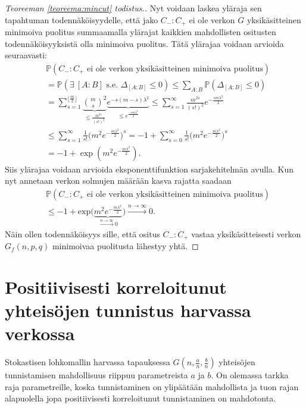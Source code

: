 \documentclass[finnish,12pt,a4paper,pdftex,sci,utf8]{aaltothesis}
\newcommand\floor[1]{\lfloor#1\rfloor}
\begin{document}
\begin{proof}[Teoreeman \ref{teoreema:mincut} todistus.]
Nyt voidaan laskea yläraja sen tapahtuman todennäköisyydelle, että jako $C_-:C_+$ ei ole verkon $G$ yksikäsitteinen minimoiva puolitus summaamalla ylärajat kaikkien mahdollisten ositusten todennäköisyyksistä olla minimoiva puolitus. Tätä ylärajaa voidaan arvioida seuraavasti:
\begin{align*}
	&\mathbb{P}(C_-:C_+ \text{ ei ole verkon yksikäsitteinen minimoiva puolitus}) \\
	&= \mathbb{P}(\exists \ [ A:B ] \text { s.e. } \Delta_{ [A:B] }
        \leq 0) \leq \sum_{A:B}^{}\mathbb{P}( \Delta_{ [A:B] } \leq 0) \\
	&= \sum_{s=1}^{\floor{\frac{m}{2}}} \underbrace{\binom{m}{s}^2}_{\leq \frac{m^{2s}}{(s!)^2}} \underbrace{e^{-s(m-s)\lambda^2}}_{ \leq e^{ \frac{-sm \lambda^2  }{2}}}
        \leq \sum_{s=1}^{\infty} \frac{m^{2s}}{(s!)^2} e^{-\frac{sm \lambda^2}{2}} \\
	&\leq \sum_{s=1}^{\infty} \frac{1}{s!} \big( m^{2}e^{-\frac{m \lambda^2}{2}} \big)^s
        = -1 + \sum_{s=0}^{\infty} \frac{1}{s!} \big( m^{2}e^{-\frac{m \lambda^2}{2}} \big)^s \\
        &= -1 + \exp(m^2 e^{-\frac{m \lambda^2}{2}}).
\end{align*}
Siis ylärajaa voidaan arvioida eksponenttifunktion sarjakehitelmän avulla. Kun nyt annetaan verkon solmujen määrään kasva rajatta saadaan
\begin{align*}
	&\mathbb{P}(C_-:C_+ \text{ ei ole verkon yksikäsitteinen minimoiva puolitus}) \\
	&\leq -1 + \text{exp}\big(\underbrace{m^2  e^{-\frac{m \lambda^2}{2} }}_{\xrightarrow{n \rightarrow \infty} 0} \big) \xrightarrow{n \rightarrow \infty} 0.
\end{align*}
Näin ollen todennäköisyys sille, että ositus $C_-:C_+$ vastaa yksikäsitteisesti verkon $G_f(n, p,q)$ minimoivaa puolitusta lähestyy yhtä.
\end{proof}

\clearpage
\section{Positiivisesti korreloitunut yhteisöjen tunnistus harvassa verkossa}
Stokastisen lohkomallin harvassa tapauksessa $G(n,\frac{a}{n}, \frac{b}{n})$ yhteisöjen tunnistamisen mahdollisuus riippuu parametreista $a$ ja $b$. On olemassa tarkka raja parametreille, koska tunnistaminen on ylipäätään mahdollista ja tuon rajan alapuolella jopa positiivisesti korreloitunut tunnistaminen on mahdotonta.
\end{document}

